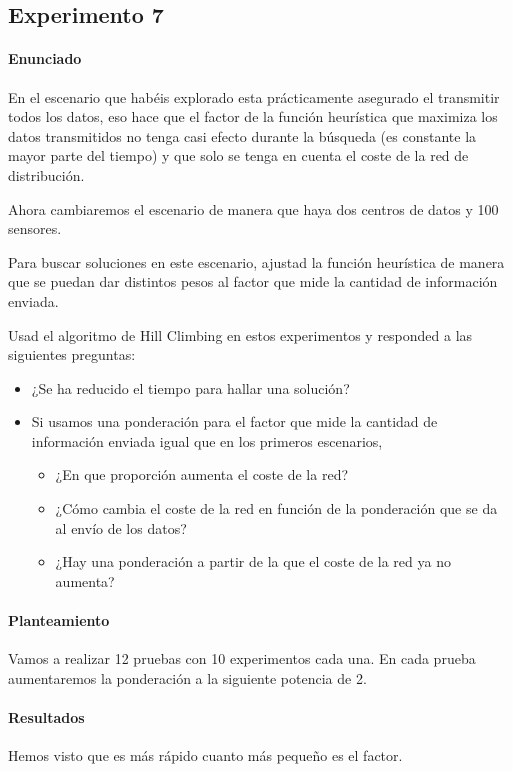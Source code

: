 \subsection{Experimento 7}
\paragraph{Enunciado}
En el escenario que habéis explorado esta prácticamente asegurado el transmitir todos los datos, eso hace que el factor de la función heurística que maximiza los datos transmitidos no tenga casi efecto durante la búsqueda (es constante la mayor parte del tiempo) y que solo se tenga en cuenta el coste de la red de distribución.

Ahora cambiaremos el escenario de manera que haya dos centros de datos y 100 sensores.

Para buscar soluciones en este escenario, ajustad la función heurística de manera que se puedan dar distintos pesos al factor que mide la cantidad de información enviada.

Usad el algoritmo de Hill Climbing en estos experimentos y responded a las siguientes preguntas:
\begin{itemize}
\item ¿Se ha reducido el tiempo para hallar una solución?

\item Si usamos una ponderación para el factor que mide la cantidad de información enviada igual que en los primeros escenarios,
\begin{itemize}
\item ¿En que proporción aumenta el coste de la red?
\item ¿Cómo cambia el coste de la red en función de la ponderación que se da al envío de los datos?
\item ¿Hay una ponderación a partir de la que el coste de la red ya no aumenta?
\end{itemize}
\end{itemize}
\paragraph{Planteamiento}
Vamos a realizar 12 pruebas con 10 experimentos cada una. En cada prueba aumentaremos la ponderación a la siguiente potencia de 2.
\paragraph{Resultados}
Hemos visto que es más rápido cuanto más pequeño es el factor.



